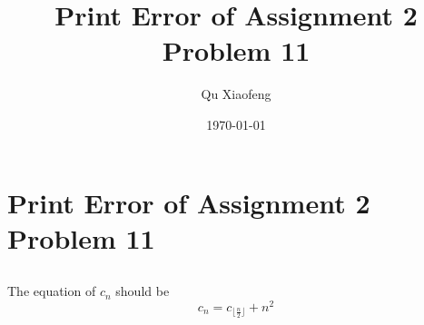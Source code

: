 \documentclass[smaller]{beamer}
\begin{document}

 

\title{Print Error of Assignment 2 Problem 11}
\author[COMP210]{Qu Xiaofeng}
\date{\today}


\section{Print Error of Assignment 2 Problem 11}

\subsection{\secname}
\begin{frame}[c]
  \frametitle{\subsecname}
The equation of $c_n$ should be 
\[
c_n = c_{\lfloor\frac{n}{2}\rfloor}+n^2
\]
\end{frame}

\end{document}
